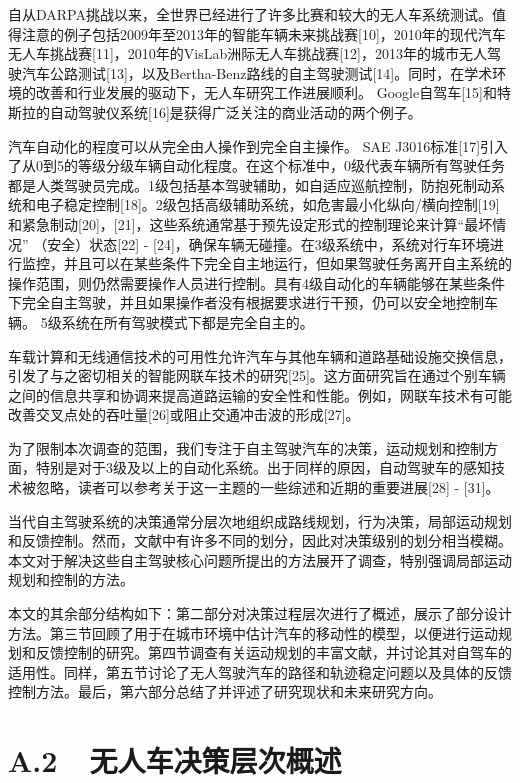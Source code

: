 自从DARPA挑战以来，全世界已经进行了许多比赛和较大的无人车系统测试。值得注意的例子包括2009年至2013年的智能车辆未来挑战赛[10]，2010年的现代汽车无人车挑战赛[11]，2010年的VisLab洲际无人车挑战赛[12]，2013年的城市无人驾驶汽车公路测试[13]，以及Bertha-Benz路线的自主驾驶测试[14]。同时，在学术环境的改善和行业发展的驱动下，无人车研究工作进展顺利。 Google自驾车[15]和特斯拉的自动驾驶仪系统[16]是获得广泛关注的商业活动的两个例子。

汽车自动化的程度可以从完全由人操作到完全自主操作。 SAE J3016标准[17]引入了从0到5的等级分级车辆自动化程度。在这个标准中，0级代表车辆所有驾驶任务都是人类驾驶员完成。1级包括基本驾驶辅助，如自适应巡航控制，防抱死制动系统和电子稳定控制[18]。2级包括高级辅助系统，如危害最小化纵向/横向控制[19]和紧急制动[20]，[21]，这些系统通常基于预先设定形式的控制理论来计算“最坏情况” （安全）状态[22] - [24]，确保车辆无碰撞。在3级系统中，系统对行车环境进行监控，并且可以在某些条件下完全自主地运行，但如果驾驶任务离开自主系统的操作范围，则仍然需要操作人员进行控制。具有4级自动化的车辆能够在某些条件下完全自主驾驶，并且如果操作者没有根据要求进行干预，仍可以安全地控制车辆。 5级系统在所有驾驶模式下都是完全自主的。

车载计算和无线通信技术的可用性允许汽车与其他车辆和道路基础设施交换信息，引发了与之密切相关的智能网联车技术的研究[25]。这方面研究旨在通过个别车辆之间的信息共享和协调来提高道路运输的安全性和性能。例如，网联车技术有可能改善交叉点处的吞吐量[26]或阻止交通冲击波的形成[27]。

为了限制本次调查的范围，我们专注于自主驾驶汽车的决策，运动规划和控制方面，特别是对于3级及以上的自动化系统。出于同样的原因，自动驾驶车的感知技术被忽略，读者可以参考关于这一主题的一些综述和近期的重要进展[28] - [31]。

当代自主驾驶系统的决策通常分层次地组织成路线规划，行为决策，局部运动规划和反馈控制。然而，文献中有许多不同的划分，因此对决策级别的划分相当模糊。本文对于解决这些自主驾驶核心问题所提出的方法展开了调查，特别强调局部运动规划和控制的方法。

本文的其余部分结构如下：第二部分对决策过程层次进行了概述，展示了部分设计方法。第三节回顾了用于在城市环境中估计汽车的移动性的模型，以便进行运动规划和反馈控制的研究。第四节调查有关运动规划的丰富文献，并讨论其对自驾车的适用性。同样，第五节讨论了无人驾驶汽车的路径和轨迹稳定问题以及具体的反馈控制方法。最后，第六部分总结了并评述了研究现状和未来研究方向。


\section*{A.2\ \ 无人车决策层次概述}

